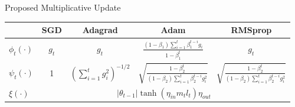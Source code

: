 \begin{frame}{Proposed Multiplicative Update}
	\begin{table}
    \renewcommand{\arraystretch}{3.5}
    \begin{tabularx}{\linewidth}{l|c|c|c|c}
      & \textbf{SGD} & \textbf{Adagrad} & \textbf{Adam} & \textbf{RMSprop} \\
      \hline
      \(\phi_{t}(\cdot)\) & \(g_t\) & \(g_t\) &
                                                          \(\frac{(1-\beta_1)\sum_{i=1}^t\beta_1^{t-i}g_i}{1-\beta_1^t}\)
                                                          &  \(g_t\) \\ \hline
      \(\psi_{t}(\cdot)\)   & 1  & \( \left( \sum_{i=1}^{t}g_i^2 \right)^{-1/2}\) &
                                                                 \(\sqrt{\frac{1-\beta_2^t}{(1-\beta_2)\sum_{i=1}^{t}\beta_2^{t-i}g_i^2}}\)
                                                          &
                                                            \(\sqrt{\frac{1-\beta_2^t}{(1-\beta_2)\sum_{i=1}^{t}\beta_2^{t-i}g_i^2}}\)\\ \hline
      \(\xi(\cdot)\) & \multicolumn{4}{c}{\cellcolor{blue!25} \(|\theta_{t-1}|\tanh{\left(\eta_{in} m_t l_t \right)}\eta_{out}\)}

    \end{tabularx}
  \end{table}
\end{frame}

